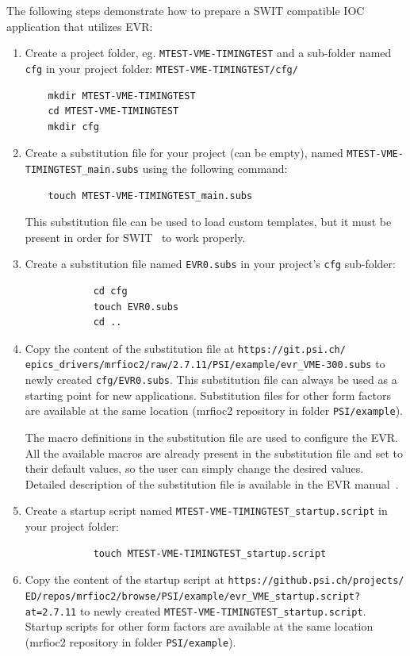 \documentclass[12pt,a4paper]{article}
\newcommand{\latestDriverVersion}{2.7.11}
\begin{document}
The following steps demonstrate how to prepare a SWIT compatible IOC application that utilizes EVR:
\begin{enumerate}

	\item Create a project folder, eg. \texttt{MTEST-VME-TIMINGTEST} and a sub-folder named \texttt{cfg} in your project folder: \texttt{MTEST-VME-TIMINGTEST/cfg/}
\begin{verbatim}
	mkdir MTEST-VME-TIMINGTEST
	cd MTEST-VME-TIMINGTEST
	mkdir cfg
\end{verbatim}

	\item Create a substitution file for your project (can be empty), named \texttt{MTEST-VME-TIMINGTEST\_main.subs} using the following command: 
\begin{verbatim}
	touch MTEST-VME-TIMINGTEST_main.subs
\end{verbatim}	
	This substitution file can be used to load custom templates, but it must be present in order for SWIT~\cite{swit} to work properly.
	
	\item 
		Create a substitution file named \texttt{EVR0.subs} in your project's \texttt{cfg} sub-folder:
		\begin{verbatim}
			cd cfg
			touch EVR0.subs
			cd ..
		\end{verbatim}
	\item \label{quickstart:copySubs} Copy the content of the substitution file  at \texttt{https://git.psi.ch/} \texttt{epics\_drivers/mrfioc2/raw/\latestDriverVersion/PSI/example/evr\_VME-300.subs} to newly created \texttt{cfg/EVR0.subs}. This substitution file can always be used as a starting point for new applications. Substitution files for other form factors are available at the same location (mrfioc2 repository in folder \texttt{PSI/example}).
	
	The macro definitions in the substitution file are used to configure the EVR. All the available macros are already present in the substitution file and set to their default values, so the user can simply change the desired values. Detailed description of the substitution file is available in the EVR manual~\cite{evr_manual}.

	\item
		Create a startup script named \texttt{MTEST-VME-TIMINGTEST\_startup.script} in your project folder:
		\begin{verbatim}
			touch MTEST-VME-TIMINGTEST_startup.script
		\end{verbatim}
	\item 
		Copy the content of the startup script at \texttt{https://github.psi.ch/projects/} \texttt{ED/repos/mrfioc2/browse/PSI/example/evr\_VME\_startup.script?at=\latestDriverVersion} to newly created \texttt{MTEST-VME-TIMINGTEST\_startup.script}. Startup scripts for other form factors are available at the same location (mrfioc2 repository in folder \texttt{PSI/example}).


\end{enumerate}
\end{document}
